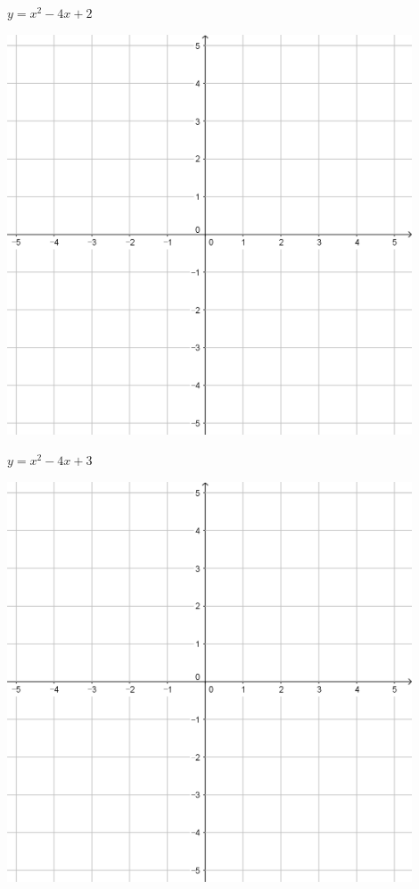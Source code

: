 \documentclass{oblivoir}
\begin{document}
\begin{minipage}{0.45\textwidth}\centering
\(y=x^2-4x+2\)
\par\bigskip\includegraphics[width=0.9\textwidth]{55}
\end{minipage}
\begin{minipage}{0.45\textwidth}\centering
\(y=x^2-4x+3\)
\par\bigskip\includegraphics[width=0.9\textwidth]{55}
\end{minipage}\bigskip\bigskip\par
\end{document}
